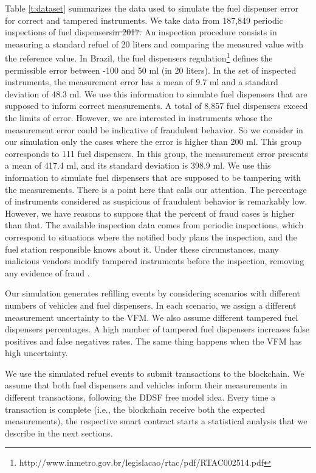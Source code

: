 \documentclass[sigplan]{acmart}
\providecommand{\DIFadd}[1]{{\protect\color{blue}\uwave{#1}}} %
\providecommand{\DIFdel}[1]{{\protect\color{red}\sout{#1}}}                      %
\providecommand{\DIFaddbegin}{} %
\providecommand{\DIFaddend}{} %
\providecommand{\DIFdelbegin}{} %
\providecommand{\DIFdelend}{} %
\begin{document}
Table \ref{t:dataset} summarizes the data used to simulate the fuel dispenser error for correct and tampered instruments.
We take data from 187,849 periodic inspections of fuel dispensers\DIFdelbegin \DIFdel{in 2017.
}\DIFdelend \DIFaddbegin \DIFadd{.
}\DIFaddend An inspection procedure consists in measuring a standard refuel of 20 liters and comparing the measured value with the reference value.
In Brazil, the fuel dispensers regulation\footnote{http://www.inmetro.gov.br/legislacao/rtac/pdf/RTAC002514.pdf} defines the permissible error between -100 and 50 ml (in 20 liters).
In the set of inspected instruments, the measurement error has a mean of 9.7 ml and a standard deviation of 48.3 ml.
We use this information to simulate fuel dispensers that are supposed to inform correct measurements.
A total of 8,857 fuel dispensers exceed the limits of error.
However, we are interested in instruments whose the measurement error could be indicative of fraudulent behavior.
So we consider in our simulation only the cases where the error is higher than 200 ml.
This group corresponds to 111 fuel dispensers.
In this group, the measurement error presents a mean of 417.4 ml, and its standard deviation is 398.9 ml.
We use this information to simulate fuel dispensers that are supposed to be tampering with the measurements.
There is a point here that calls our attention.
The percentage of instruments considered as suspicious of fraudulent behavior is remarkably low.
However, we have reasons to suppose that the percent of fraud cases is higher than that.
The available inspection data comes from periodic inspections, which correspond to situations where the notified body plans the inspection, and the fuel station responsible knows about it.
Under these circumstances, many malicious vendors modify tampered instruments before the inspection, removing any evidence of fraud \cite{Leitao2014a,Beteto2016}.

Our simulation generates refilling events by considering scenarios with different numbers of vehicles and fuel dispensers.
In each scenario, we assign a different measurement uncertainty to the VFM.
We also assume different tampered fuel dispensers percentages.
A high number of tampered fuel dispensers increases false positives and false negatives rates.
The same thing happens when the VFM has high uncertainty.

We use the simulated refuel events to submit transactions to the blockchain.
We assume that both fuel dispensers and vehicles inform their measurements in different transactions, following the DDSF free model idea.
Every time a transaction is complete (i.e., the blockchain receive both the expected measurements), the respective smart contract starts a statistical analysis that we describe in the next sections.
\end{document}
